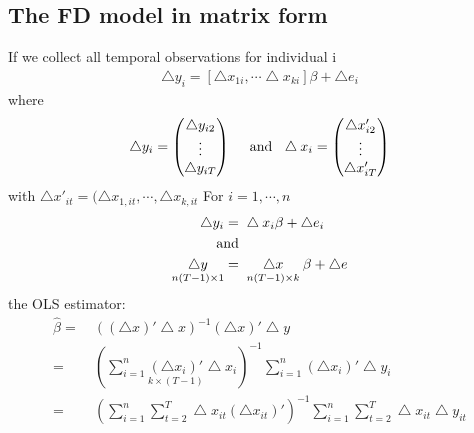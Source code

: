 \documentclass[a4paper,twoside,11pt]{article}
\begin{document}
\subsection{The FD model in matrix form}
If we collect all temporal observations for individual i
\begin{equation*}
\begin{aligned}
\bigtriangleup y_i = [\bigtriangleup x_{1i}, \cdots \bigtriangleup x_{ki}] \beta + \bigtriangleup e_i
\end{aligned}
\end{equation*}
where
\begin{equation*}
\begin{aligned}
\bigtriangleup y_i = 
\begin{pmatrix} 
\bigtriangleup y_{i2} \\
\vdots \\
\bigtriangleup y_{iT} \end{pmatrix} \ \ \ \ \textmd{and} \ \ \bigtriangleup x_i = \begin{pmatrix}
\bigtriangleup x'_{i2} \\
\vdots \\
\bigtriangleup x_{iT}'
\end{pmatrix}
\end{aligned}
\end{equation*}
with $\bigtriangleup x'_{it} = (\bigtriangleup x_{1,it}, \cdots, \bigtriangleup x_{k,it}$
\newline
\newline
For $i=1,\cdots, n$
\begin{equation*}
\begin{aligned}
\bigtriangleup y_i =& \  \bigtriangleup x_i \beta + \bigtriangleup e_i \\
\textmd{and}&  \  \\
\underset{n(T-1) \times 1}{\bigtriangleup y} =& \  \underset{n(T-1) \times k}{\bigtriangleup x} \beta + \bigtriangleup e 
\end{aligned}
\end{equation*}
the OLS estimator:
\begin{equation*}
\begin{aligned}
\hat{\beta} =& \ ((\bigtriangleup x)' \bigtriangleup x)^{-1} (\bigtriangleup x)' \bigtriangleup y \\
=& \ (\sum^n_{i=1} \underset{k \times (T-1)}{(\bigtriangleup x_i)'} \bigtriangleup x_i )^{-1} \sum^n_{i=1} (\bigtriangleup x_i)' \bigtriangleup y_i \\
=& \ (\sum^n_{i=1} \sum^T_{t=2} \bigtriangleup x_{it} (\bigtriangleup x_{it})' )^{-1} \sum^n_{i=1} \sum^T_{t=2} \bigtriangleup x_{it} \bigtriangleup y_{it}
\end{aligned}
\end{equation*}
\end{document}
